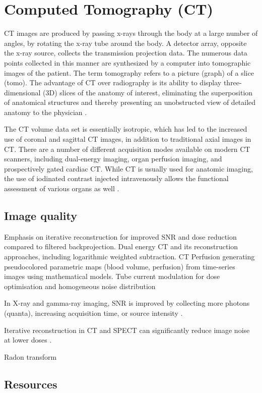 \chapter{Computed Tomography (CT)}

CT images are produced by passing x-rays through the body at a large
number of angles, by rotating the x-ray tube around the body. A
detector array, opposite the x-ray source, collects the transmission
projection data. The numerous data points collected in this manner are
synthesized by a computer into tomographic images of the patient. The
term tomography refers to a picture (graph) of a slice (tomo). The
advantage of CT over radiography is its ability to display
three-dimensional (3D) slices of the anatomy of interest, eliminating
the superposition of anatomical structures and thereby presenting an
unobstructed view of detailed anatomy to the physician
\cite{bushberg2011essential}.

The CT volume data set is essentially isotropic, which has led to
the increased use of coronal and sagittal CT images, in addition to
traditional axial images in CT. There are a number of different
acquisition modes available on modern CT scanners, including
dual-energy imaging, organ perfusion imaging, and prospectively gated
cardiac CT. While CT is usually used for anatomic imaging, the use of
iodinated contrast injected intravenously allows the functional
assessment of various organs as well \cite{bushberg2011essential}.

\section{Image quality}

Emphasis on iterative reconstruction for improved SNR and dose
reduction compared to filtered backprojection. Dual energy CT and its
reconstruction approaches, including logarithmic weighted
subtraction. CT Perfusion generating pseudocolored parametric maps
(blood volume, perfusion) from time-series images using mathematical
models. Tube current modulation for dose optimisation and homogeneous
noise distribution

In X-ray and gamma-ray imaging, SNR is improved by collecting more
photons (quanta), increasing acquisition time, or source intensity
\cite{bushberg2011essential}.


Iterative reconstruction in CT and SPECT can significantly reduce
image noise at lower doses \cite{bushberg2011essential}.

Radon transform


\section{Resources}


